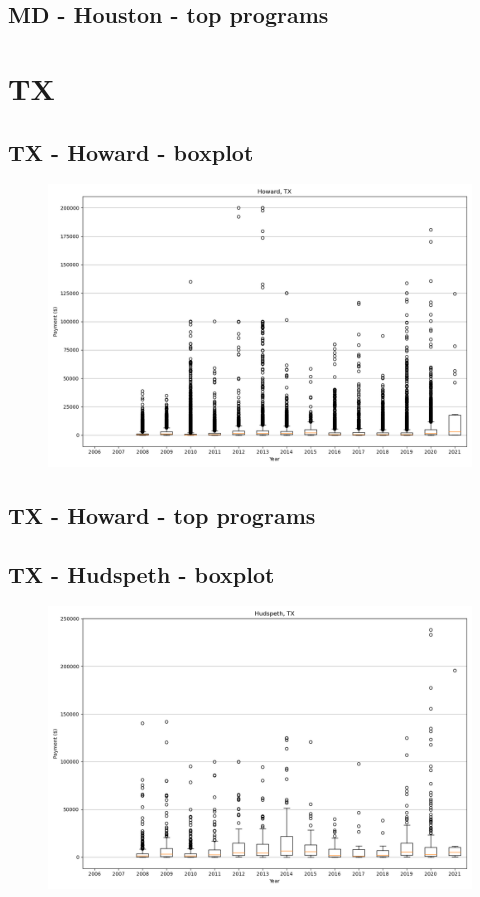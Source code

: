 \subsection*{MD - Houston - top programs}

\newpage
\section*{TX}
\subsection*{TX - Howard - boxplot}
\begin{figure}[h]
\centering
\includegraphics[width=7in]{../output/boxplots/counties/Howard-TX_boxplot.png}
\end{figure}


\subsection*{TX - Howard - top programs}

\newpage
\subsection*{TX - Hudspeth - boxplot}
\begin{figure}[h]
\centering
\includegraphics[width=7in]{../output/boxplots/counties/Hudspeth-TX_boxplot.png}
\end{figure}


